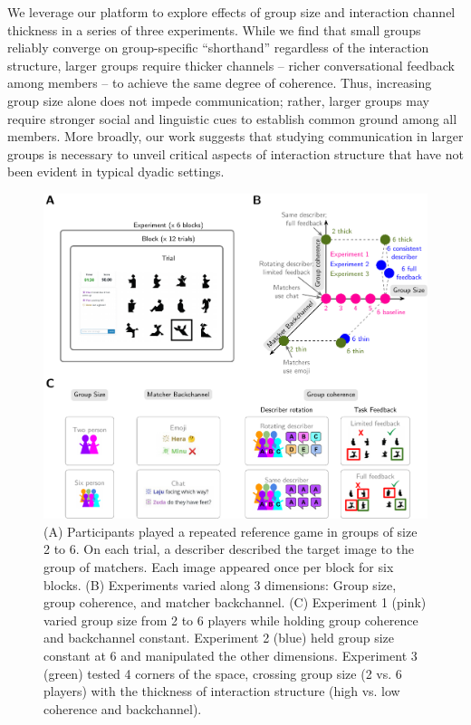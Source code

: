 \documentclass[
  english,
]{article}
\begin{document}
We leverage our platform to explore effects of group size and interaction channel thickness in a series of three experiments.
While we find that small groups reliably converge on group-specific ``shorthand'' regardless of the interaction structure, larger groups require thicker channels -- richer conversational feedback among members -- to achieve the same degree of coherence.
Thus, increasing group size alone does not impede communication; rather, larger groups may require stronger social and linguistic cues to establish common ground among all members.
More broadly, our work suggests that studying communication in larger groups is necessary to unveil critical aspects of interaction structure that have not been evident in typical dyadic settings.

\begin{figure}[t!]

{\centering \includegraphics[width=1\linewidth]{expt-diagram3} 

}

\caption{(A) Participants played a repeated reference game in groups of size 2 to 6. On each trial, a describer described the target image to the group of matchers. Each image appeared once per block for six blocks. (B) Experiments varied along 3 dimensions: Group size, group coherence, and matcher backchannel. (C) Experiment 1 (pink) varied group size from 2 to 6 players while holding group coherence and backchannel constant. Experiment 2 (blue) held group size constant at 6 and manipulated the other dimensions. Experiment 3 (green) tested 4 corners of the space, crossing group size (2 vs. 6 players) with the thickness of interaction structure (high vs. low coherence and backchannel).}\label{fig:diagram}
\end{figure}
\end{document}

